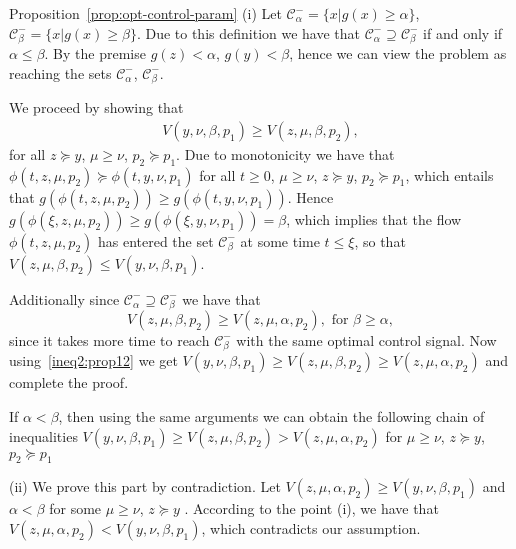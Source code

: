 \documentclass[letterpaper, 10pt, journal]{IEEEtran}  %
\newcommand{\cC}{{\mathcal C}}
\def\QED{\mbox{\rule[0pt]{1.3ex}{1.3ex}}} %
\newenvironment{proof-of}[1]{{\it Proof of #1:\,}}{\hfill\QED\par}
\begin{document}
\begin{proof-of}{Proposition~\ref{prop:opt-control-param}}
	(i) Let $\cC_\alpha^- = \{x | g(x) \ge \alpha\}$, $\cC_\beta^- = \{x | g(x) \ge \beta\}$. Due to this definition we have that $\cC_\alpha^- \supseteq \cC_\beta^-$ if and only if $\alpha\le\beta$. By the premise $g(z) < \alpha$, $g(y) < \beta$, hence we can view the problem as reaching the sets $\cC_\alpha^-$, $\cC_\beta^-$.  
	
	We proceed by showing that 
	\begin{gather}
	V(y, \nu, \beta, p_1) \ge V(z, \mu, \beta, p_2), \label{ineq2:prop12}
	\end{gather}
	for all $z\succeq y$, $\mu\ge \nu$, $p_2 \succeq p_1$. 	Due to monotonicity we have that $\phi(t, z, \mu, p_2) \succeq \phi(t, y, \nu, p_1)$ for all $t\ge0$, $\mu\ge \nu$, $z\succeq y$, $p_2 \succeq p_1$, which entails that $g(\phi(t, z, \mu, p_2)) \ge g(\phi(t, y, \nu, p_1))$. Hence 	$g(\phi(\xi, z, \mu, p_2)) \ge g(\phi(\xi, y, \nu, p_1)) = \beta$, which implies that the flow $\phi(t, z, \mu, p_2)$ has entered the set $\cC_\beta^-$ at some time $t \le \xi$, so that $V(z, \mu, \beta, p_2) \le V(y, \nu, \beta, p_1)$.  
	
	Additionally since $\cC_\alpha^-\supseteq\cC_\beta^-$ we have that 
	\begin{equation}\label{ineq1:prop12}
	V(z, \mu, \beta, p_2) \ge V(z, \mu, \alpha, p_2), \text{ for } \beta\ge \alpha,
	\end{equation}
	since it takes more time to reach  $\cC_\beta^-$ with the same optimal control signal. Now using~\eqref{ineq2:prop12} we get
	$V(y, \nu, \beta, p_1)  \ge V(z, \mu, \beta, p_2) \ge V(z, \mu, \alpha, p_2)$ and complete the proof. 
	
	If $\alpha < \beta$, then using the same arguments we can obtain the following chain of inequalities $V(y, \nu, \beta, p_1)  \ge V(z, \mu, \beta, p_2) > V(z, \mu, \alpha, p_2)$ for $\mu \ge \nu$, $z\succeq y$, $p_2\succeq p_1$
	
	(ii) We prove this part by contradiction. Let $V(z, \mu, \alpha, p_2) \ge V(y, \nu, \beta, p_1)$ and $\alpha < \beta$ for some $\mu \ge \nu$, $z\succeq y$ . According to the point (i), we have that $V(z, \mu, \alpha, p_2) < V(y, \nu, \beta, p_1)$, which contradicts our assumption. 
\end{proof-of}
\end{document}
